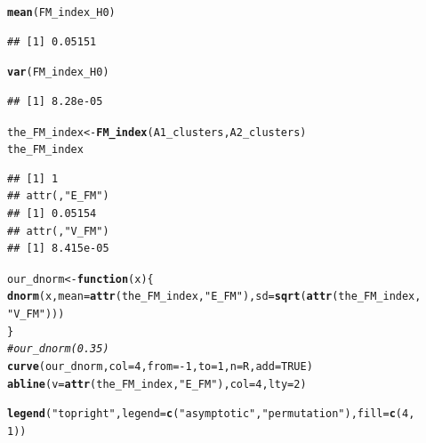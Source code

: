 \documentclass[shortnames,nojss,article]{jss}\usepackage[]{graphicx}\usepackage[]{color}
\makeatletter
\newcommand{\hlnum}[1]{\textcolor[rgb]{0.686,0.059,0.569}{#1}}%
\newcommand{\hlstr}[1]{\textcolor[rgb]{0.192,0.494,0.8}{#1}}%
\newcommand{\hlcom}[1]{\textcolor[rgb]{0.678,0.584,0.686}{\textit{#1}}}%
\newcommand{\hlopt}[1]{\textcolor[rgb]{0,0,0}{#1}}%
\newcommand{\hlstd}[1]{\textcolor[rgb]{0.345,0.345,0.345}{#1}}%
\newcommand{\hlkwa}[1]{\textcolor[rgb]{0.161,0.373,0.58}{\textbf{#1}}}%
\newcommand{\hlkwb}[1]{\textcolor[rgb]{0.69,0.353,0.396}{#1}}%
\newcommand{\hlkwc}[1]{\textcolor[rgb]{0.333,0.667,0.333}{#1}}%
\newcommand{\hlkwd}[1]{\textcolor[rgb]{0.737,0.353,0.396}{\textbf{#1}}}%
\newenvironment{kframe}{%
 \def\at@end@of@kframe{}%
 \ifinner\ifhmode%
  \def\at@end@of@kframe{\end{minipage}}%
  \begin{minipage}{\columnwidth}%
 \fi\fi%
 \def\FrameCommand##1{\hskip\@totalleftmargin \hskip-\fboxsep
 \colorbox{shadecolor}{##1}\hskip-\fboxsep
     \hskip-\linewidth \hskip-\@totalleftmargin \hskip\columnwidth}%
 \MakeFramed {\advance\hsize-\width
   \@totalleftmargin\z@ \linewidth\hsize
   \@setminipage}}%
 {\par\unskip\endMakeFramed%
 \at@end@of@kframe}
\newenvironment{knitrout}{}{} %
\makeatother
\begin{document}
\begin{knitrout}
\begin{kframe}
\begin{alltt}
\hlkwd{mean}\hlstd{(FM_index_H0)}
\end{alltt}
\begin{verbatim}
## [1] 0.05151
\end{verbatim}
\begin{alltt}
\hlkwd{var}\hlstd{(FM_index_H0)}
\end{alltt}
\begin{verbatim}
## [1] 8.28e-05
\end{verbatim}
\begin{alltt}
\hlstd{the_FM_index} \hlkwb{<-} \hlkwd{FM_index}\hlstd{(A1_clusters, A2_clusters)}
\hlstd{the_FM_index}
\end{alltt}
\begin{verbatim}
## [1] 1
## attr(,"E_FM")
## [1] 0.05154
## attr(,"V_FM")
## [1] 8.415e-05
\end{verbatim}
\begin{alltt}
\hlstd{our_dnorm} \hlkwb{<-} \hlkwa{function}\hlstd{(}\hlkwc{x}\hlstd{) \{}
    \hlkwd{dnorm}\hlstd{(x,} \hlkwc{mean} \hlstd{=} \hlkwd{attr}\hlstd{(the_FM_index,} \hlstr{"E_FM"}\hlstd{),} \hlkwc{sd} \hlstd{=} \hlkwd{sqrt}\hlstd{(}\hlkwd{attr}\hlstd{(the_FM_index,}
        \hlstr{"V_FM"}\hlstd{)))}
\hlstd{\}}
\hlcom{# our_dnorm(0.35)}
\hlkwd{curve}\hlstd{(our_dnorm,} \hlkwc{col} \hlstd{=} \hlnum{4}\hlstd{,} \hlkwc{from} \hlstd{=} \hlopt{-}\hlnum{1}\hlstd{,} \hlkwc{to} \hlstd{=} \hlnum{1}\hlstd{,} \hlkwc{n} \hlstd{= R,} \hlkwc{add} \hlstd{=} \hlnum{TRUE}\hlstd{)}
\hlkwd{abline}\hlstd{(}\hlkwc{v} \hlstd{=} \hlkwd{attr}\hlstd{(the_FM_index,} \hlstr{"E_FM"}\hlstd{),} \hlkwc{col} \hlstd{=} \hlnum{4}\hlstd{,} \hlkwc{lty} \hlstd{=} \hlnum{2}\hlstd{)}

\hlkwd{legend}\hlstd{(}\hlstr{"topright"}\hlstd{,} \hlkwc{legend} \hlstd{=} \hlkwd{c}\hlstd{(}\hlstr{"asymptotic"}\hlstd{,} \hlstr{"permutation"}\hlstd{),} \hlkwc{fill} \hlstd{=} \hlkwd{c}\hlstd{(}\hlnum{4}\hlstd{,}
    \hlnum{1}\hlstd{))}
\end{alltt}
\end{kframe}


\end{knitrout}
\end{document}

